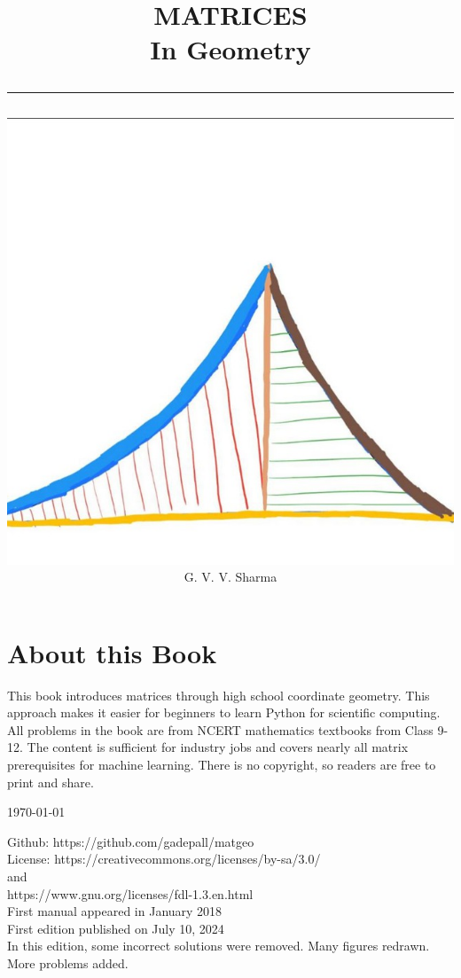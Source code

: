 \documentclass[journal]{IEEEtran}
\begin{document}

\onecolumn


\title{
	\begin{flushleft}
	MATRICES \\ In Geometry
	\\
\rule{0.4\columnwidth}{0.4pt}
\end{flushleft}
}
\author{
\vspace{7cm}
	\begin{flushleft}
\includegraphics[width=0.3\columnwidth]{figs/logo.jpg}
\\
		{	\huge G. V. V. Sharma}
	\end{flushleft}
}
\maketitle

\newpage
\section*{About this Book}

This book introduces matrices through high school coordinate geometry. This approach makes it easier for beginners to learn Python for scientific computing. All problems in the book are from NCERT mathematics textbooks from Class 9-12.   
The content is sufficient for industry jobs and covers nearly all matrix prerequisites for machine learning.
There is no copyright, so readers are free to print and share.  
\begin{flushright}
\today
\end{flushright}
Github: https://github.com/gadepall/matgeo
		\\
License: https://creativecommons.org/licenses/by-sa/3.0/
\\
and
\\
https://www.gnu.org/licenses/fdl-1.3.en.html
\\
First manual appeared in January 2018
\\
First edition published on July 10, 2024
\\
In this edition, some incorrect solutions were removed.  Many figures redrawn. More problems added.
\end{document}
